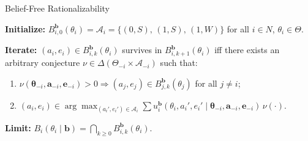 \documentclass[10pt,aspectratio=169, compressed]{beamer}
\begin{document}





\begin{frame}[noframenumbering, label=BFRdef]{Belief-Free Rationalizability}

{\small
\begin{definition}
\textbf{Initialize:} $B^{\mathbf{b}}_{i,0}(\theta_i) = \mathcal{A}_i = \{(0, S),\, (1, S),\, (1, W)\}$ for all $i \in N$, $\theta_i \in \Theta$.
\vspace{0.2em}

\textbf{Iterate:} $(a_i, e_i) \in B^{\mathbf{b}}_{i,k}(\theta_i)$ survives in $B^{\mathbf{b}}_{i,k+1}(\theta_i)$ iff there exists an arbitrary conjecture $\nu \in \Delta(\Theta_{-i} \times \mathcal{A}_{-i})$ such that:
\begin{enumerate}
  \item[(i)] $\nu(\boldsymbol{\theta}_{-i}, \mathbf{a}_{-i}, \mathbf{e}_{-i}) > 0 \Rightarrow (a_j, e_j) \in B^{\mathbf{b}}_{j,k}(\theta_j)$ for all $j \neq i$;
  \item[(ii)] $(a_i, e_i) \in \arg\max_{(a_i', e_i') \in \mathcal{A}_i} \sum u_i^{\mathbf{b}}(\theta_i, a_i', e_i' \mid \boldsymbol{\theta}_{-i}, \mathbf{a}_{-i}, \mathbf{e}_{-i})\, \nu(\cdot)$.
\end{enumerate}
\vspace{0.2em}
\textbf{Limit:} $B_i(\theta_i \mid \mathbf{b}) = \bigcap_{k \geq 0} B^{\mathbf{b}}_{i,k}(\theta_i)$.
\end{definition}
}

\hfill\hyperlink{solutionconcept}{}
\end{frame}
\end{document}
